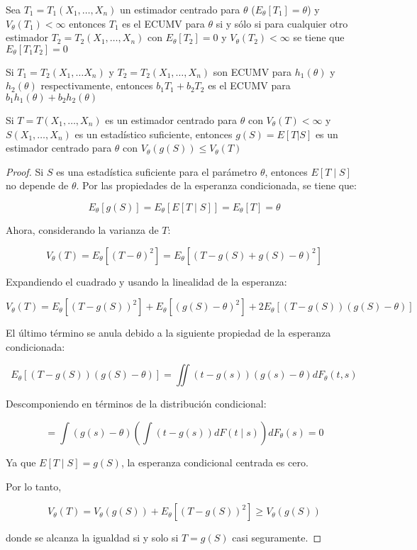 \begin{teorema}
  Sea $T_1 = T_1(X_1, \ldots, X_n)$ un estimador centrado para $\theta$ ($E_{\theta}[T_1] = \theta$) y $V_{\theta}(T_1) < \infty$ entonces $T_1$ es el ECUMV para $\theta$ si y sólo si para cualquier otro estimador $T_2 = T_2(X_1, \ldots, X_n)$ con $E_{\theta}[T_2] = 0$ y $V_{\theta}(T_2) < \infty$ se tiene que $E_{\theta}[T_1T_2] = 0$
\end{teorema}

\begin{corolario}
  Si $T_1 = T_2(X_1, \ldots X_n)$ y $T_2 = T_2(X_1, \ldots, X_n)$ son ECUMV para $h_1(\theta)$ y $h_2(\theta)$ respectivamente, entonces $b_1T_1 + b_2T_2$ es el ECUMV para $b_1h_1(\theta) + b_2h_2(\theta)$
\end{corolario}

\begin{teorema}
  Si $T = T(X_1, \ldots, X_n)$ es un estimador centrado para $\theta$ con $V_{\theta}(T) < \infty$ y $S(X_1, \ldots, X_n)$ es un estadístico suficiente, entonces $g(S) = E[T | S]$ es un estimador centrado para $\theta$ con $V_{\theta}(g(S)) \leq V_{\theta}(T)$
\end{teorema}

\begin{proof}
  Si $S$ es una estadística suficiente para el parámetro $\theta$, entonces $E[T \mid S]$ no depende de $\theta$. Por las propiedades de la esperanza condicionada, se tiene que:

  \[
    E_{\theta}[g(S)] = E_{\theta}[E[T \mid S]] = E_{\theta}[T] = \theta
  \]

  Ahora, considerando la varianza de $T$:

  \[
    V_{\theta}(T) = E_{\theta}[(T - \theta)^2] = E_{\theta}[(T - g(S) + g(S) - \theta)^2]
  \]

  Expandiendo el cuadrado y usando la linealidad de la esperanza:

  \[
    V_{\theta}(T) = E_{\theta}[(T - g(S))^2] + E_{\theta}[(g(S) - \theta)^2] + 2E_{\theta}[(T - g(S))(g(S) - \theta)]
  \]

  El último término se anula debido a la siguiente propiedad de la esperanza
  condicionada:

  \[
    E_{\theta}[(T - g(S))(g(S) - \theta)] = \iint (t - g(s))(g(s) - \theta) dF_{\theta}(t, s)
  \]

  Descomponiendo en términos de la distribución condicional:

  \[
    = \int (g(s) - \theta) \left( \int (t - g(s)) dF(t \mid s) \right) dF_{\theta}(s) = 0
  \]

  Ya que $E[T \mid S] = g(S)$, la esperanza condicional centrada es cero.

  Por lo tanto,

  \[
    V_{\theta}(T) = V_{\theta}(g(S)) + E_{\theta}[(T - g(S))^2] \geq V_{\theta}(g(S))
  \]

  donde se alcanza la igualdad si y solo si $T = g(S)$ casi seguramente.
\end{proof}

